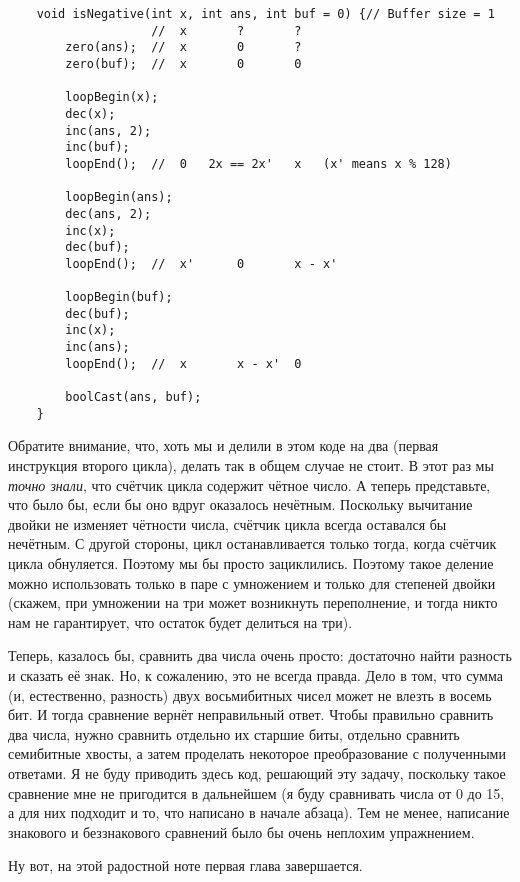 \documentclass{book}
\begin{document}
\begin{verbatim}
    void isNegative(int x, int ans, int buf = 0) {// Buffer size = 1
                    //  x       ?       ?
        zero(ans);  //  x       0       ?
        zero(buf);  //  x       0       0

        loopBegin(x);
        dec(x);
        inc(ans, 2);
        inc(buf);
        loopEnd();  //  0   2x == 2x'   x   (x' means x % 128)

        loopBegin(ans);
        dec(ans, 2);
        inc(x);
        dec(buf);
        loopEnd();  //  x'      0       x - x'

        loopBegin(buf);
        dec(buf);
        inc(x);
        inc(ans);
        loopEnd();  //  x       x - x'  0

        boolCast(ans, buf);
    }
\end{verbatim}

Обратите внимание, что, хоть мы и делили в этом коде на два (первая инструкция второго цикла), делать так в общем
случае не стоит. В этот раз мы {\em точно знали}, что счётчик цикла содержит чётное число. А теперь представьте, что было бы,
если бы оно вдруг оказалось нечётным. Поскольку вычитание двойки не изменяет чётности числа, счётчик цикла всегда оставался
бы нечётным. С другой стороны, цикл останавливается только тогда, когда счётчик цикла обнуляется. Поэтому мы бы просто зациклились.
Поэтому такое деление можно использовать только в паре с умножением и только для степеней двойки (скажем, при умножении на три
может возникнуть переполнение, и тогда никто нам не гарантирует, что остаток будет делиться на три). 

Теперь, казалось бы, сравнить два числа очень просто: достаточно найти разность и сказать её знак. Но, к сожалению, это не всегда
правда. Дело в том, что сумма (и, естественно, разность) двух восьмибитных чисел может не влезть в восемь бит. И тогда сравнение
вернёт неправильный ответ. Чтобы правильно сравнить два числа, нужно сравнить отдельно их старшие биты, отдельно сравнить семибитные
хвосты, а затем проделать некоторое преобразование с полученными ответами. Я не буду приводить здесь код, решающий эту задачу,
поскольку такое сравнение мне не пригодится в дальнейшем (я буду сравнивать числа от 0 до 15, а для них подходит и то, что написано
в начале абзаца). Тем не менее, написание знакового и беззнакового сравнений было бы очень неплохим упражнением.

Ну вот, на этой радостной ноте первая глава завершается.
\end{document}
